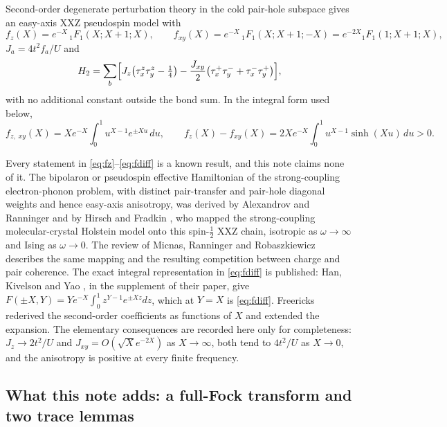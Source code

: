 \documentclass[11pt]{article}
\theoremstyle{definition}
\theoremstyle{remark}
\begin{document}
Second-order degenerate perturbation theory in the cold pair-hole subspace gives
an easy-axis XXZ pseudospin model with
\begin{equation}
f_{z}(X)=e^{-X}\,{}_{1}F_{1}(X;X+1;X),\qquad
f_{xy}(X)=e^{-X}\,{}_{1}F_{1}(X;X+1;-X)
=e^{-2X}{}_{1}F_{1}(1;X+1;X),
\label{eq:fz}
\end{equation}
$J_{a}=4t^{2}f_{a}/U$ and
\begin{equation}
H_{2}=\sum_{b}\Bigl[J_{z}\bigl(\tau_{x}^{z}\tau_{y}^{z}-\tfrac14\bigr)
-\frac{J_{xy}}{2}\bigl(\tau_{x}^{+}\tau_{y}^{-}
+\tau_{x}^{-}\tau_{y}^{+}\bigr)\Bigr],
\label{eq:H2}
\end{equation}
with no additional constant outside the bond sum. In the integral form used
below,
\begin{equation}
f_{z,\;xy}(X)=Xe^{-X}\!\int_{0}^{1}\!u^{X-1}e^{\pm Xu}\,du,
\qquad
f_{z}(X)-f_{xy}(X)=2Xe^{-X}\!\int_{0}^{1}\!u^{X-1}\sinh(Xu)\,du>0 .
\label{eq:fdiff}
\end{equation}

Every statement in \eqref{eq:fz}--\eqref{eq:fdiff} is a known result, and this
note claims none of it. The bipolaron or pseudospin effective Hamiltonian of the
strong-coupling electron-phonon problem, with distinct pair-transfer and
pair-hole diagonal weights and hence easy-axis anisotropy, was derived by
Alexandrov and Ranninger \cite{ar81} and by Hirsch and Fradkin \cite{hf83}, who
mapped the strong-coupling molecular-crystal Holstein model onto this
spin-$\frac12$ XXZ chain, isotropic as $\omega\to\infty$ and Ising as
$\omega\to0$. The review of
Micnas, Ranninger and Robaszkiewicz \cite{mrr90} describes the same mapping and
the resulting competition between charge and pair coherence. The exact integral
representation in \eqref{eq:fdiff} is published: Han, Kivelson and Yao
\cite{hky20}, in the supplement of their paper, give
$F(\pm X,Y)=Ye^{-X}\int_{0}^{1}z^{Y-1}e^{\pm Xz}dz$, which at $Y=X$ is
\eqref{eq:fdiff}. Freericks \cite{freericks93} rederived the second-order
coefficients as functions of $X$ and extended the expansion. The elementary
consequences are recorded here only for completeness: $J_{z}\to 2t^{2}/U$ and
$J_{xy}=O(\sqrt{X}e^{-2X})$ as $X\to\infty$, both tend to $4t^{2}/U$ as
$X\to0$, and the anisotropy is positive at every finite frequency.

\subsection{What this note adds: a full-Fock transform and two trace lemmas}
\end{document}
